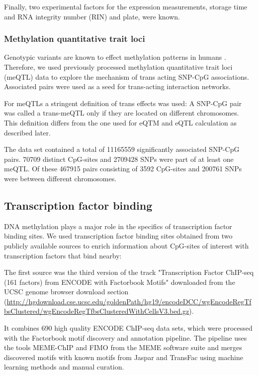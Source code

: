 \documentclass[a4paper,12pt]{article}
\begin{document}
Finally, two experimental factors for the expression measurements, storage time and RNA integrity number (RIN) and plate, were known.

\subsubsection{Methylation quantitative trait loci}
Genotypic variants are known to effect methylation patterns in humans \cite{}. Therefore, we used previously processed methylation quantitative trait loci (meQTL) data to explore the mechanism of trans acting SNP-CpG associations. Associated pairs were used as a seed for trans-acting interaction networks.

For meQTLs a stringent definition of trans effects was used: A SNP-CpG pair was called a trans-meQTL only if they are located on different chromosomes. This definition differs from the one used for eQTM and eQTL calculation as described later. 

The data set contained a total of 11165559 significantly associated SNP-CpG pairs. 
70709 distinct CpG-sites and 2709428 SNPs were part of at least one meQTL. Of these 467915 pairs consisting of 3592 CpG-sites and 200761 SNPs were between different chromosomes. 


\subsection{Transcription factor binding}
DNA methylation plays a major role in the specifics of transcription factor binding sites\cite{Yineaaj2239}. We used transcription factor binding sites obtained from two publicly available sources to enrich information about CpG-sites of interest with transcription factors that bind nearby: 

The first source was the third version of the track "Transcription Factor ChIP-seq (161 factors) from ENCODE with Factorbook Motifs"\cite{10.1101/gr.139105.112} downloaded from the UCSC genome browser download section (\url{http://hgdownload.cse.ucsc.edu/goldenPath/hg19/encodeDCC/wgEncodeRegTfbsClustered/wgEncodeRegTfbsClusteredWithCellsV3.bed.gz}).

It combines 690 high quality ENCODE ChIP-seq data sets, which were processed with the Factorbook motif discovery and annotation pipeline\cite{10.1101/gr.139105.112}. The pipeline uses the tools MEME-ChIP\cite{10.1093/bioinformatics/btr189} and FIMO\cite{10.1093/bioinformatics/btr064} from the MEME software suite and merges discovered motifs with known motifs from Jaspar\cite{10.1093/nar/gkx1126} and TransFac\cite{10.1093/nar/gkj143} using machine learning methods and manual curation. 
\end{document}
